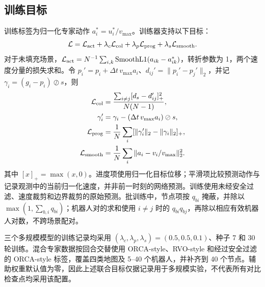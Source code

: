 \documentclass[conference]{IEEEtran}
\begin{document}
\subsection{训练目标}
训练标签为归一化专家动作 $a_i^*=u_i^*/v_{\max}$。训练器支持以下目标：
\begin{equation}
\mathcal L=\mathcal L_{\rm act}+\lambda_c\mathcal L_{\rm col}
+\lambda_p\mathcal L_{\rm prog}+\lambda_s\mathcal L_{\rm smooth}.
\end{equation}
对于未填充场景，$\mathcal L_{\rm act}=N^{-1}\sum_{i,k}\operatorname{SmoothL1}(a_{ik}-a_{ik}^*)$，转折参数为 1，两个速度分量的损失求和。令 $p_i'=p_i+\Delta t\,v_{\max}a_i$、$d_{ij}'=\|p_i'-p_j'\|_2$，并记 $\gamma_i=(g_i-p_i)\oslash s$，则
\begin{equation}
\begin{aligned}
\mathcal L_{\rm col}&=\frac{\sum_{i\ne j}[d_s-d_{ij}']_+^2}{N(N-1)},\\
\gamma_i'&=\gamma_i-(\Delta t\,v_{\max}a_i)\oslash s,\\
\mathcal L_{\rm prog}&=\frac1N\sum_i[\|\gamma_i'\|_2-\|\gamma_i\|_2]_+,\\
\mathcal L_{\rm smooth}&=\frac1N\sum_i\|a_i-v_i/v_{\max}\|_2^2.
\end{aligned}
\end{equation}
其中 $[x]_+=\max(x,0)$。进度项使用归一化目标位移；平滑项比较预测动作与记录观测中的当前归一化速度，并非前一时刻的网络预测。训练使用未经安全过滤、速度裁剪和边界裁剪的原始预测。批训练中，节点项按 $q_{bi}$ 掩蔽，并除以 $\max(1,\sum_{b,i}q_{bi})$；机器人对的求和使用 $i\ne j$ 时的 $q_{bi}q_{bj}$，再除以相应有效机器人对数，不跨场景配对。

三个多规模模型的训练记录均采用 $(\lambda_c,\lambda_p,\lambda_s)=(0.5,0.5,0.1)$、种子 7 和 30 轮训练。混合专家数据按回合交替使用 ORCA-style、RVO-style 和经过安全过滤的 ORCA-style 标签，覆盖四类地图及 5--40 个机器人，并补齐到 40 个节点。辅助权重默认值为零，因此上述联合目标仅据记录用于多规模实验，不代表所有对比检查点均采用该配置。
\end{document}
